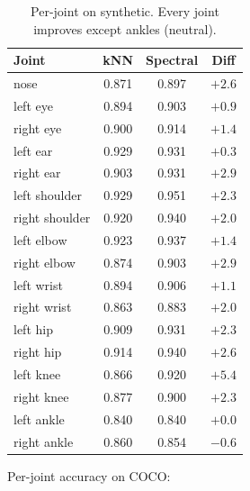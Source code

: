 \begin{table}[H]
\centering
\footnotesize
\begin{tabular}{lccc}
\toprule
Joint & kNN & Spectral & Diff \\
\midrule
nose & 0.871 & 0.897 & $+2.6$ \\
left eye & 0.894 & 0.903 & $+0.9$ \\
right eye & 0.900 & 0.914 & $+1.4$ \\
left ear & 0.929 & 0.931 & $+0.3$ \\
right ear & 0.903 & 0.931 & $+2.9$ \\
left shoulder & 0.929 & 0.951 & $+2.3$ \\
right shoulder & 0.920 & 0.940 & $+2.0$ \\
left elbow & 0.923 & 0.937 & $+1.4$ \\
right elbow & 0.874 & 0.903 & $+2.9$ \\
left wrist & 0.894 & 0.906 & $+1.1$ \\
right wrist & 0.863 & 0.883 & $+2.0$ \\
left hip & 0.909 & 0.931 & $+2.3$ \\
right hip & 0.914 & 0.940 & $+2.6$ \\
left knee & 0.866 & 0.920 & $+5.4$ \\
right knee & 0.877 & 0.900 & $+2.3$ \\
left ankle & 0.840 & 0.840 & $+0.0$ \\
right ankle & 0.860 & 0.854 & $-0.6$ \\
\bottomrule
\end{tabular}
\caption{Per-joint on synthetic. Every joint improves except ankles (neutral).}
\end{table}

Per-joint accuracy on COCO:

